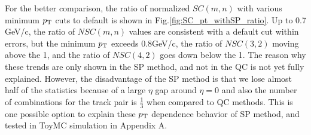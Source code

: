  For the better comparison, the ratio of normalized $SC(m,n)$ with various minimum $p_{\rm{T}}$ cuts to default is shown in Fig.\ref{fig:SC_pt_withSP_ratio}. Up to 0.7 GeV/c, the ratio of $NSC(m,n)$ values are consistent with a default cut within errors, but the minimum $p_{\rm{T}}$ exceeds 0.8GeV/c, the ratio of $NSC(3,2)$ moving above the 1, and the ratio of $NSC(4,2)$ goes down below the 1. The reason why these trends are only shown in the SP method, and not in the QC is not yet fully explained. However, the disadvantage of the SP method is that we lose almost half of the statistics because of a large $\eta$ gap around $\eta=0$ and also the number of combinations for the track pair is $\frac{1}{3}$ when compared to QC methods. This is one possible option to explain these $p_{\rm{T}}$ dependence behavior of SP method, and  tested in ToyMC simulation in Appendix A.

